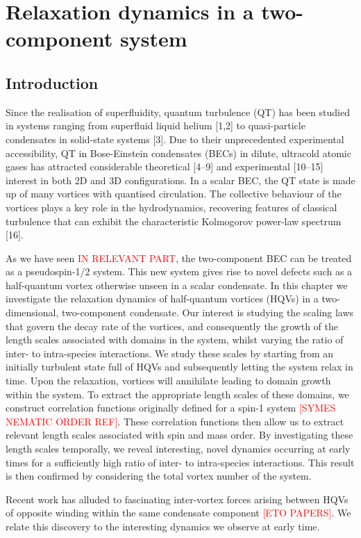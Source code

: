 \chapter{Relaxation dynamics in a two-component system}

\section{Introduction}
Since the realisation of superfluidity, quantum turbulence (QT) has been studied in systems ranging from 
superfluid liquid helium [1,2] to quasi-particle condensates in solid-state systems [3]. 
Due to their unprecedented experimental accessibility, QT in Bose-Einstein condensates (BECs) in dilute, 
ultracold atomic gases has attracted considerable theoretical [4–9] and experimental [10–15] interest in 
both 2D and 3D configurations.
In a scalar BEC, the QT state is made up of many vortices with quantised circulation. 
The collective behaviour of the vortices plays a key role in the hydrodynamics, recovering features of 
classical turbulence that can exhibit the characteristic Kolmogorov power-law spectrum [16].

As we have seen \textcolor{red}{IN RELEVANT PART}, the two-component BEC can be treated as a pseudospin-1/2 system. 
This new system gives rise to novel defects such as a half-quantum vortex otherwise unseen in a scalar condensate. 
In this chapter we investigate the relaxation dynamics of half-quantum vortices (HQVs) in a two-dimensional, 
two-component condensate. 
Our interest is studying the scaling laws that govern the decay rate of the vortices, and consequently the 
growth of the length scales associated with domains in the system, whilst varying the ratio of inter- to 
intra-species interactions. 
We study these scales by starting from an initially turbulent state full of HQVs and subsequently letting 
the system relax in time. 
Upon the relaxation, vortices will annihilate leading to domain growth within the system.
To extract the appropriate length scales of these domains, we construct correlation functions originally 
defined for a spin-1 system \textcolor{red}{[SYMES NEMATIC ORDER REF]}. 
These correlation functions then allow us to extract relevant length scales associated with spin and mass order. 
By investigating these length scales temporally, we reveal interesting, novel dynamics occurring at early 
times for a sufficiently high ratio of inter- to intra-species interactions. 
This result is then confirmed by considering the total vortex number of the system. 
\par
Recent work has alluded to fascinating inter-vortex forces arising between HQVs of opposite winding within 
the same condensate component \textcolor{red}{[ETO PAPERS]}. We relate this discovery to the interesting 
dynamics we observe at early time.